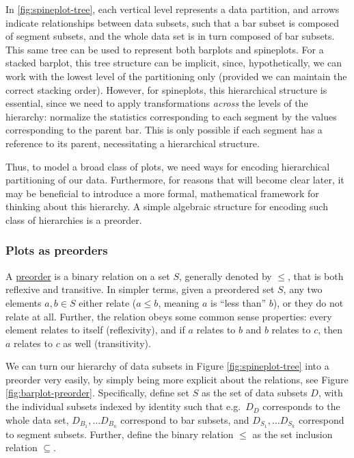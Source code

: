 \documentclass[
  openany]{book}
\theoremstyle{definition}
\theoremstyle{definition}
\theoremstyle{definition}
\theoremstyle{definition}
\theoremstyle{remark}
\begin{document}
In \ref{fig:spineplot-tree}, each vertical level represents a data partition, and arrows indicate relationships between data subsets, such that a bar subset is composed of segment subsets, and the whole data set is in turn composed of bar subsets. This same tree can be used to represent both barplots and spineplots. For a stacked barplot, this tree structure can be implicit, since, hypothetically, we can work with the lowest level of the partitioning only (provided we can maintain the correct stacking order). However, for spineplots, this hierarchical structure is essential, since we need to apply transformations \emph{across} the levels of the hierarchy: normalize the statistics corresponding to each segment by the values corresponding to the parent bar. This is only possible if each segment has a reference to its parent, necessitating a hierarchical structure.

Thus, to model a broad class of plots, we need ways for encoding hierarchical partitioning of our data. Furthermore, for reasons that will become clear later, it may be beneficial to introduce a more formal, mathematical framework for thinking about this hierarchy. A simple algebraic structure for encoding such class of hierarchies is a preorder.

\subsubsection{Plots as preorders}\label{plots-as-preorders}

A \hyperref[preorders]{preorder} is a binary relation on a set \(S\), generally denoted by \(\leq\), that is both reflexive and transitive. In simpler terms, given a preordered set \(S\), any two elements \(a, b \in S\) either relate (\(a \leq b\), meaning \(a\) is ``less than'' \(b\)), or they do not relate at all. Further, the relation obeys some common sense properties: every element relates to itself (reflexivity), and if \(a\) relates to \(b\) and \(b\) relates to \(c\), then \(a\) relates to \(c\) as well (transitivity).

We can turn our hierarchy of data subsets in Figure \ref{fig:spineplot-tree} into a preorder very easily, by simply being more explicit about the relations, see Figure \ref{fig:barplot-preorder}. Specifically, define set \(S\) as the set of data subsets \(D\), with the individual subsets indexed by identity such that e.g.~\(D_D\) corresponds to the whole data set, \(D_{B_1}, \ldots D_{B_n}\) correspond to bar subsets, and \(D_{S_1}, \ldots D_{S_k}\) correspond to segment subsets. Further, define the binary relation \(\leq\) as the set inclusion relation \(\subseteq\).
\end{document}
